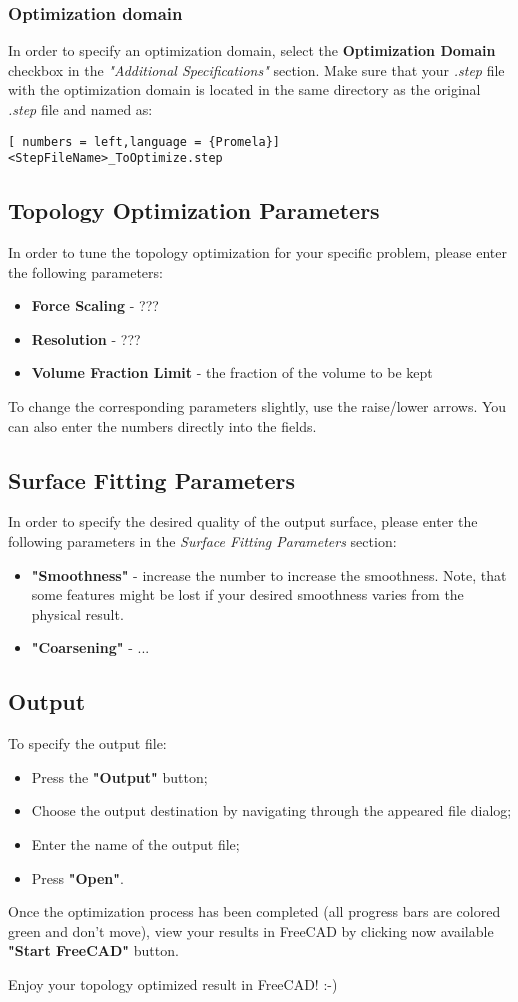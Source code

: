 \documentclass[
12pt, %
a4paper, %
oneside, %
headinclude,footinclude, %
BCOR5mm, %
]{scrartcl}
\begin{document}
\subsubsection{Optimization domain}
In order to specify an optimization domain, select the \textbf{Optimization Domain} checkbox in the \textit{"Additional Specifications"} section. Make sure that your \textit{.step} file with the optimization domain is located in the same directory as the original \textit{.step} file and named as:
\begin{lstlisting}[ numbers = left,language = {Promela}]
<StepFileName>_ToOptimize.step
\end{lstlisting}
\subsection{Topology Optimization Parameters}
In order to tune the topology optimization for your specific problem, please enter the following parameters:
\begin{itemize}
\item \textbf{Force Scaling} - ???
\item \textbf{Resolution} - ???
\item \textbf{Volume Fraction Limit} - the fraction of the volume to be kept
\end{itemize}

To change the corresponding parameters slightly, use the raise/lower arrows. You can also enter the numbers directly into the fields.
\subsection{Surface Fitting Parameters}
In order to specify the desired quality of the output surface, please enter the following parameters in the \textit{Surface Fitting Parameters} section:
\begin{itemize}
\item \textbf{"Smoothness"} - increase the number to increase the smoothness. Note, that some features might be lost if your desired smoothness varies from the physical result.
\item \textbf{"Coarsening"} - ...
\end{itemize}
\subsection{Output}
To specify the output file:
\begin{itemize}
\item Press the \textbf{"Output"} button;
\item Choose the output destination by navigating through the appeared file dialog;
\item Enter the name of the output file;
\item Press \textbf{"Open"}.
\end{itemize}

Once the optimization process has been completed (all progress bars are colored green and don't move), view your results in FreeCAD by clicking now available \textbf{"Start FreeCAD"} button.

Enjoy your topology optimized result in FreeCAD! :-)
\end{document}
